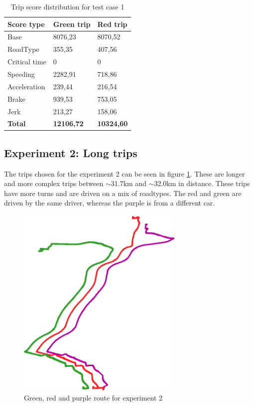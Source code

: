 \begin{table}
    \centering
    \begin{tabular}{lll}
    \textbf{Score type} & \textbf{Green trip} & \textbf{Red trip} \\ \hline
    Base                & 8076,23             & 8070,52           \\
    RoadType            & 355,35              & 407,56            \\
    Critical time       & 0                   & 0                 \\
    Speeding            & 2282,91             & 718,86            \\
    Acceleration        & 239,44              & 216,54            \\
    Brake               & 939,53              & 753,05            \\
    Jerk                & 213,27              & 158,06            \\ \hline
    \textbf{Total}      & \textbf{12106,72}   & \textbf{10324,60} \\ \hline
    \end{tabular}
    \caption{Trip score distribution for test case 1}
    \label{tab:shorttripscores}
\end{table}

\subsection{Experiment 2: Long trips} \label{subsec:expe2}
The trips chosen for the experiment 2 can be seen in figure \ref{fig:longtrips}. These are longer and more complex trips between $\sim$31.7km and $\sim$32.0km in distance. These trips have more turns and are driven on a mix of roadtypes. The red and green are driven by the same driver, whereas the purple is from a different car.

\begin{figure}[tb]
    \centering
    \includegraphics[width=80mm]{Pictures/LongTrips.png}
    \caption{Green, red and purple route for experiment 2}
    \label{fig:longtrips}
\end{figure}

